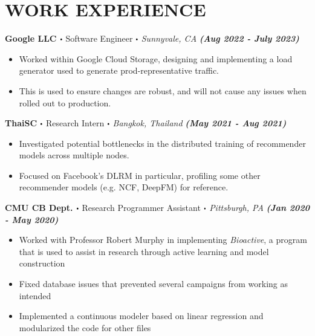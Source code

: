 \documentclass[10pt]{article}
\newcommand\sbullet[1][.5]{\mathbin{\vcenter{\hbox{\scalebox{#1}{$\bullet$}}}}}
\begin{document}
  \section*{\large \textcolor{lighterB} {WORK EXPERIENCE}}
  \vspace*{-0.23cm}

  \textbf{\large Google LLC $\sbullet$} {\large Software Engineer $\sbullet$ \textit{Sunnyvale, CA} \hfill \textit{\textbf{(Aug 2022 - July 2023)}}}

  \vspace*{-0.2cm}
  \begin{itemize}
    \itemsep-0.4em
\item \textcolor{lighterG}{Worked within Google Cloud Storage, designing and implementing a load generator used to generate prod-representative traffic.}
    \item \textcolor{lighterG}{This is used to ensure changes are robust, and will not cause any issues when rolled out to production.}
  \end{itemize}

  \textbf{\large ThaiSC $\sbullet$} {\large Research Intern $\sbullet$ \textit{Bangkok, Thailand} \hfill \textit{\textbf{(May 2021 - Aug 2021)}}}

  \vspace*{-0.2cm}
  \begin{itemize}
    \itemsep-0.4em
    \item \textcolor{lighterG}{Investigated potential bottlenecks in the distributed training of recommender models across multiple nodes.}
    \item \textcolor{lighterG}{Focused on Facebook's DLRM in particular, profiling some other recommender models (e.g. NCF, DeepFM) for reference.}
  \end{itemize}

  \textbf{\large CMU CB Dept. $\sbullet$} {\large Research Programmer Assistant $\sbullet$ \textit{Pittsburgh, PA} \hfill \textit{\textbf{(Jan 2020 - May 2020)}}}

  \vspace*{-0.2cm}
  \begin{itemize}
    \itemsep-0.4em
    \item \textcolor{lighterG}{Worked with Professor Robert Murphy in implementing \textit{Bioactive}, a program that is used to assist in research through active learning and model construction}
    \item \textcolor{lighterG}{Fixed database issues that prevented several campaigns from working as intended}
    \item \textcolor{lighterG}{Implemented a continuous modeler based on linear regression and modularized the code for other files}
  \end{itemize}
\end{document}

